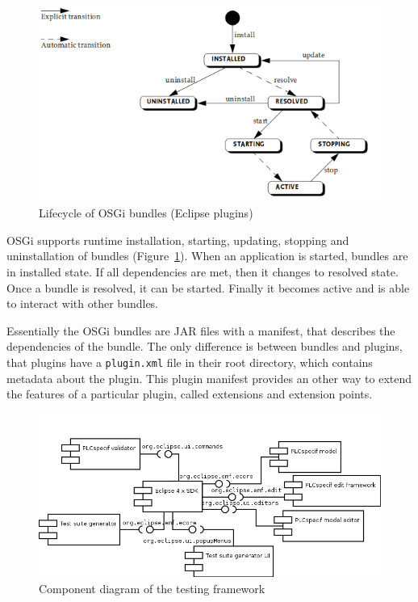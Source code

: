 \begin{figure}[htp]
\centering
\includegraphics[scale=0.5]{figures/design_osgi.png}
\caption{Lifecycle of OSGi bundles (Eclipse plugins) \cite{osgi}}
\label{fig:designosgi}
\end{figure}

OSGi supports runtime installation, starting, updating, stopping and uninstallation of bundles (Figure~\ref{fig:designosgi}). When an application is started, bundles are in installed state. If all dependencies are met, then it changes to resolved state. Once a bundle is resolved, it can be started. Finally it becomes active and is able to interact with other bundles.

Essentially the OSGi bundles are JAR files with a manifest, that describes the dependencies of the bundle. The only difference is between bundles and plugins, that plugins have a \texttt{plugin.xml} file in their root directory, which contains metadata about the plugin. This plugin manifest provides an other way to extend the features of a particular plugin, called extensions and extension points.

\begin{figure}[htp]
\centering
\includegraphics[scale=0.5]{figures/design_components.png}
\caption{Component diagram of the testing framework}
\label{fig:designcomponents}
\end{figure}

